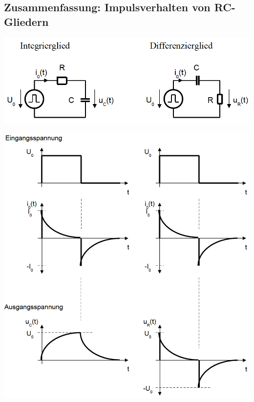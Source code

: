 \subsection{Zusammenfassung: Impulsverhalten von RC-Gliedern}
\begin{center}
\includegraphics[scale=0.5]{../img/IV/IVh}
\end{center}
\begin{center}
\includegraphics[scale=0.45]{../img/IV/IVj}
\end{center}

